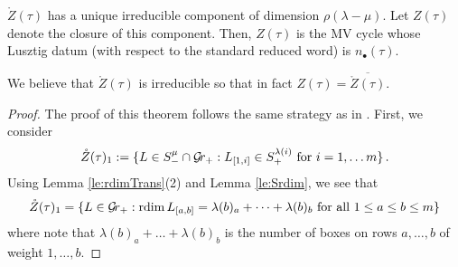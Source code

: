 \documentclass[draft]{article} %
\begin{document}
\begin{proposition}
    \label{pr:newmvdes}
    $ \mathring Z(\tau)$ has a unique irreducible component of dimension $ \rho(\lambda - \mu)$.  Let $ Z(\tau)$ denote the closure of this component.  Then, 
    $Z(\tau)$ is the MV cycle whose Lusztig datum (with respect to the standard reduced word) is $n_\bullet(\tau)$. 
\end{proposition}
\begin{remark}
We believe that $ \mathring Z(\tau)$ is irreducible so that in fact $ Z(\tau) = \overline{ \mathring Z(\tau)}$.
\end{remark}

\begin{proof}
    The proof of this theorem follows the same strategy as in \cite{dthesis}.
% 
First, we consider 
\begin{equation*}
\mathring Z(\tau)_1 := \{ L \in S^\mu_- \cap \mathcal{G}\!r_+ : L_{[1,i]} \in S_+^{\lambda(i)} \text{ for } i = 1, \dots m\} \,. 
\end{equation*}
% 
Using Lemma \ref{le:rdimTrans}(2) and Lemma \ref{le:Srdim}, we see that
$$
\mathring Z(\tau)_1 = \{ L \in \mathcal{G}\!r_+ : \operatorname{rdim} L_{[a,b]} = \lambda(b)_a + \dots + \lambda(b)_b \text{ for all $ 1 \le a \le b \le m $} \}
$$
where note that $ \lambda(b)_a + \dots + \lambda(b)_b$ is the number of boxes on rows $ a, \dots, b$ of weight $ 1, \dots, b $.


\end{proof}
\end{document}
